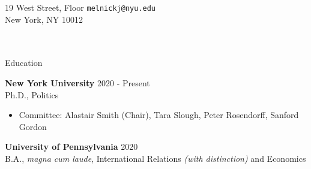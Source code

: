 \documentclass{resume} %
\begin{document}
19 West  Street,  Floor \hfill \texttt{melnickj@nyu.edu}\\
New York, NY 10012 \hfill \texttt{\href{justinmelnick.github.io}{}} \\\\\\
\begin{rSection}{Education}

{\bf New York University} \hfill { 2020 - Present} \\
Ph.D., Politics 
\begin{itemize}
    \item Committee: Alastair Smith (Chair), Tara Slough, Peter Rosendorff, Sanford Gordon
\end{itemize}
\vspace*{0.075in}

{\bf University of Pennsylvania} \hfill { 2020} 
\\B.A., \emph{magna cum laude}, International Relations \emph{(with distinction)} and Economics


\end{rSection}
\end{document}
